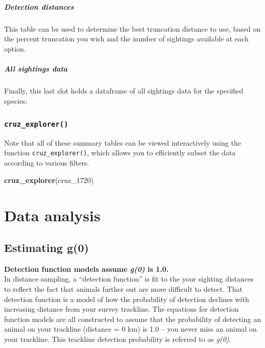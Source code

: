 \documentclass[
]{book}
\newenvironment{Shaded}{\begin{snugshade}}{\end{snugshade}}
\newcommand{\DecValTok}[1]{\textcolor[rgb]{0.00,0.00,0.81}{#1}}
\newcommand{\KeywordTok}[1]{\textcolor[rgb]{0.13,0.29,0.53}{\textbf{#1}}}
\newcommand{\NormalTok}[1]{#1}
\begin{document}
\hypertarget{detection-distances}{%
\subsubsection*{Detection distances}\label{detection-distances}}

This table can be used to determine the best truncation distance to use, based on the
percent truncation you wish and the number of sightings available at each option.

\hypertarget{all-sightings-data}{%
\subsubsection*{All sightings data}\label{all-sightings-data}}

Finally, this last slot holds a dataframe of all sightings data for the specified species:

\hypertarget{cruz_explorer}{%
\section*{\texorpdfstring{\texttt{cruz\_explorer()}}{cruz\_explorer()}}\label{cruz_explorer}}

Note that all of these summary tables can be viewed interactively using the function \texttt{cruz\_explorer()},
which allows you to efficiently subset the data according to various filters.

\begin{Shaded}
\begin{Highlighting}[]
\KeywordTok{cruz_explorer}\NormalTok{(cruz_}\DecValTok{1720}\NormalTok{)}
\end{Highlighting}
\end{Shaded}

\hypertarget{part-data-analysis}{%
\part{Data analysis}\label{part-data-analysis}}

\hypertarget{g0}{%
\chapter{Estimating g(0)}\label{g0}}

\textbf{Detection function models assume \emph{g(0)} is 1.0.}\\
In distance sampling, a ``detection function'' is fit to the your sighting distances to reflect the fact that animals farther out are more difficult to detect. That detection function is a model of how the probability of detection declines with increasing distance from your survey trackline. The equations for detection function models are all constructed to assume that the probability of detecting an animal on your trackline (distance = 0 km) is 1.0 -- you never miss an animal on your trackline. This trackline detection probability is referred to as \emph{g(0)}.
\end{document}
